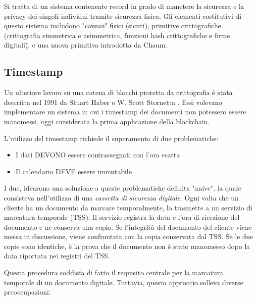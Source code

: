 Si tratta di un sistema contenente record in grado di manetere la sicurezza e la privacy dei singoli individui tramite sicurezza fisica. Gli elementi costitutivi di questo sistema includono "caveau" fisici (sicuri), primitive crittografiche (crittografia simmetrica e asimmetrica, funzioni hash crittografiche e firme digitali), e una nuova primitiva introdotta da Chaum.

\subsection{Timestamp}
Un ulteriore lavoro su una catena di blocchi protetta da crittografia è stata descritta nel 1991 da Stuart Haber e W. Scott Stornetta \cite{haber1990time}. Essi volevano implementare un sistema in cui i timestamp dei documenti non potessero essere manomessi, oggi considerata la prima applicazione della blockchain.

L'utilizzo del timestamp richiede il superamento di due problematiche:
\begin{itemize}
  \item I dati DEVONO essere contrassegnati con l'ora esatta
  \item Il calendario DEVE essere immutabile
\end{itemize}

I due, idearono una soluzione a queste problematiche definita "naive", la quale consisteva nell'utilizzo di una \textit{cassetta di sicurezza digitale}. Ogni volta che un cliente ha un documento da marcare temporalmente, lo trasmette a un servizio di marcatura temporale (TSS). Il servizio registra la data e l'ora di ricezione del documento e ne conserva una copia. Se l'integrità del documento del cliente viene messa in discussione, viene confrontata con la copia conservata dal TSS. Se le due copie sono identiche, è la prova che il documento non è stato manomesso dopo la data riportata nei registri del TSS.

Questa procedura soddisfa di fatto il requisito centrale per la marcatura temporale di un documento digitale. Tuttavia, questo approccio solleva diverse preoccupazioni:

